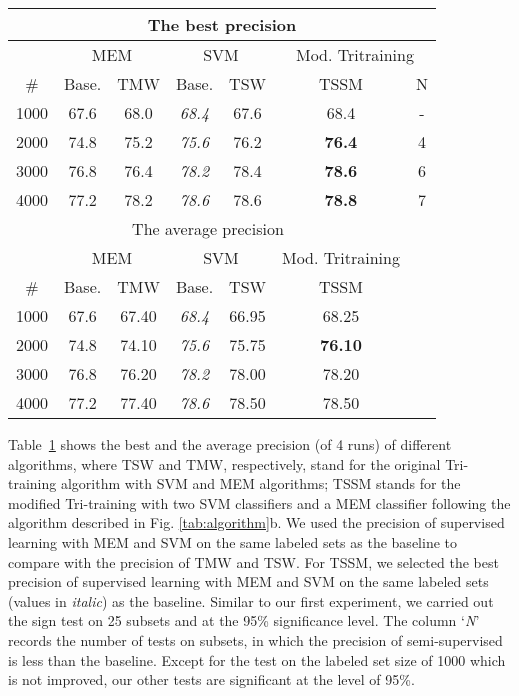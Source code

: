 \documentclass[english]{jnlp_1.4}
\begin{document}
\begin{table}[b]
\label{experiment2}
\centering 
\begin{tabular}{|c||c|c||c|c||c|c||}
  \hline
  \multicolumn{7}{|c|}{The best precision} \\
  \hline
  &
  \multicolumn{2}{|c|}{MEM } &
  \multicolumn{2}{|c|}{SVM } &
  \multicolumn{2}{|c|}{Mod. Tritraining} \\
  \hline
  \# & Base. &  TMW &  Base. & TSW  & TSSM & N \\  \hline
   1000 & 67.6  & 68.0 & \textit{68.4}  & 67.6 & 68.4 & - \\
   2000 & 74.8  & 75.2 & \textit{75.6}  & 76.2 & \textbf{76.4} & 4 \\
   3000 & 76.8  & 76.4 & \textit{78.2} &  78.4 & \textbf{78.6} & 6 \\
   4000 & 77.2  & 78.2 & \textit{78.6} & 78.6 & \textbf{78.8} & 7 \\
  \hline
  \hline
\multicolumn{6}{|c|}{The average precision} \\
\cline{1-6}
  &
  \multicolumn{2}{|c|}{MEM } &
  \multicolumn{2}{|c|}{SVM } &
  Mod. Tritraining \\
\cline{1-6}
  \# & Base.  & TMW &  Base. &  TSW  & TSSM  \\  \cline{1-6}
   1000 & 67.6  & 67.40 & \textit{68.4} &  66.95 & 68.25  \\
   2000 & 74.8  & 74.10 & \textit{75.6} &  75.75 & \textbf{76.10}  \\
   3000 & 76.8  & 76.20 & \textit{78.2} &  78.00 & 78.20  \\
   4000 & 77.2  & 77.40 & \textit{78.6} &  78.50 & 78.50  \\
\cline{1-6}
\end{tabular}
\end{table}


Table~\ref{experiment2} shows the best and the average precision
(of 4 runs) of different algorithms, where TSW  and TMW,
respectively, stand for the original Tri-training algorithm with
SVM and MEM algorithms; TSSM stands for the modified Tri-training
with two SVM classifiers and a MEM classifier following the
algorithm described in Fig. \ref{tab:algorithm}b. We used the
precision of supervised learning with MEM and SVM on the same
labeled sets as the baseline to compare with the precision of  TMW
and TSW. For TSSM, we selected the best precision of supervised
learning with MEM and SVM on the same labeled sets (values in
\textit{italic}) as the baseline. Similar to our first experiment,
we carried out the sign test on 25 subsets and at the 95\%
significance level. The column `\textit{N}' records the number of
tests on subsets, in which the precision of semi-supervised is
less than the baseline. Except for the test on the labeled set
size of 1000 which is not improved, our other tests are
significant at the level of 95\%.
\end{document}
